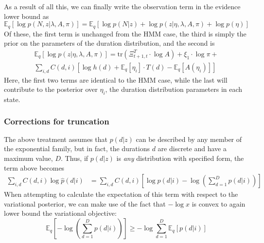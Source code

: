 \documentclass[11pt]{article}
\begin{document}
As a result of all this, we can finally write the observation term in the evidence lower bound as
\begin{equation}
    \mathbb{E}_q[\log p(N, z|\lambda, A, \pi)] =
    \mathbb{E}_q[\log p(N|z) + \log p(z|\eta, \lambda, A, \pi) + \log p(\eta)]
\end{equation}
Of these, the first term is unchanged from the HMM case, the third is simply the prior on the parameters of the duration distribution, and the second is
\begin{multline}
    \mathbb{E}_q [\log p(z|\eta, \lambda, A, \pi)] =
    \mathrm{tr}(\Xi^T_{t+1, t} \cdot \log A) + \xi_1 \cdot \log \pi + \\
    \sum_{i, d} C(d, i) [ \log h(d) + \mathbb{E}_q[\eta_i] \cdot T(d) -
    \mathbb{E}_q[A(\eta_i)] ]
\end{multline}
Here, the first two terms are identical to the HMM case, while the last will contribute to the posterior over $\eta_i$, the duration distribution parameters in each state.

\subsubsection{Corrections for truncation}
The above treatment assumes that $p(d|z)$ can be described by any member of the exponential family, but in fact, the durations $d$ are discrete and have a maximum value, $D$. Thus, if $p(d|z)$ is \emph{any} distribution with specified form, the term above becomes
\begin{align}
    \sum_{i, d} C(d, i) \log \hat{p}(d|i) &= \sum_{i, d} C(d, i) \left[
    \log p(d|i) - \log \left(\sum_{d=1}^D p(d|i) \right)
    \right]
\end{align}
When attempting to calculate the expectation of this term with respect to the variational posterior, we can make use of the fact that $-\log x$ is convex to again lower bound the variational objective:
\begin{equation}
    \mathbb{E}_q\left[-\log \left(\sum_{d=1}^D p(d|i) \right)\right] \ge
    -\log \sum_{d=1}^D \mathbb{E}_q\left[ p(d|i) \right]
\end{equation}
\end{document}
